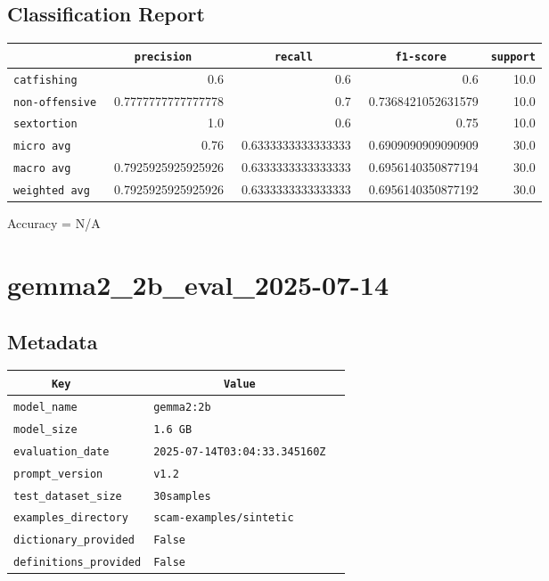 \documentclass{article}
\begin{document}
\subsection{Classification Report}

\begin{center}
\begin{tabular}{l | r | r | r | r} \hline
    \verb|            | & \verb|    precision     | & \verb|      recall      | & \verb|     f1-score     | & \verb|support| \\ \hline
    \hline
    \verb|catfishing | & 0.6 & 0.6 & 0.6 &    10.0 \\ \hline
    \verb|non-offensive| & 0.7777777777777778 & 0.7 & 0.7368421052631579 &    10.0 \\ \hline
    \verb|sextortion | & 1.0 & 0.6 & 0.75 &    10.0 \\ \hline
    \verb|micro avg  | & 0.76 & 0.6333333333333333 & 0.6909090909090909 &    30.0 \\ \hline
    \verb|macro avg  | & 0.7925925925925926 & 0.6333333333333333 & 0.6956140350877194 &    30.0 \\ \hline
    \verb|weighted avg| & 0.7925925925925926 & 0.6333333333333333 & 0.6956140350877192 &    30.0 \\ \hline
\end{tabular}
\end{center}

\begin{center}
Accuracy = N/A
\end{center}

\section{gemma2\_2b\_eval\_2025-07-14}
\subsection{Metadata}

\begin{center}
\begin{tabular}{l | l} \hline
    \verb|      Key      | & \verb|           Value           | \\ \hline
    \hline
    \verb|model_name    | & \verb|gemma2:2b                    | \\ \hline
    \verb|model_size    | & \verb|1.6 GB                       | \\ \hline
    \verb|evaluation_date| & \verb|2025-07-14T03:04:33.345160Z  | \\ \hline
    \verb|prompt_version| & \verb|v1.2                         | \\ \hline
    \verb|test_dataset_size| & \verb|30samples                    | \\ \hline
    \verb|examples_directory| & \verb|scam-examples/sintetic       | \\ \hline
    \verb|dictionary_provided| & \verb|False                        | \\ \hline
    \verb|definitions_provided| & \verb|False                        | \\ \hline
\end{tabular}
\end{center}
\end{document}
